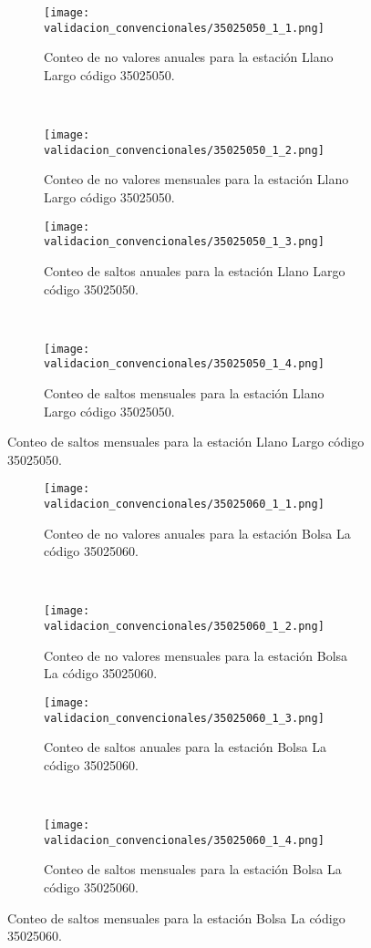 \begin{figure}[H]\ContinuedFloat
\centering
	\begin{subfigure}[normla]{0.4\textwidth}
	\texttt{[image: validacion\_convencionales/35025050\_1\_1.png]}
		\caption{Conteo de no valores anuales para la estación Llano Largo código 35025050.}
		\label{subfig:a1}
		\end{subfigure}
		~
    \begin{subfigure}[normla]{0.4\textwidth}
	\texttt{[image: validacion\_convencionales/35025050\_1\_2.png]}
		\caption{Conteo de no valores mensuales para la estación Llano Largo código 35025050.}
		\label{subfig:a2}
		\end{subfigure}
		
    \begin{subfigure}[normla]{0.4\textwidth}
	\texttt{[image: validacion\_convencionales/35025050\_1\_3.png]}
		\caption{Conteo de saltos anuales para la estación Llano Largo código 35025050.}
		\label{subfig:a1}
		\end{subfigure}
		~
    \begin{subfigure}[normla]{0.4\textwidth}
	\texttt{[image: validacion\_convencionales/35025050\_1\_4.png]}
		\caption{Conteo de saltos mensuales para la estación Llano Largo código 35025050.}
		\label{subfig:a2}
		\end{subfigure}

	
\end{figure}
           
\begin{figure}[H]\ContinuedFloat
\centering
	\begin{subfigure}[normla]{0.4\textwidth}
	\texttt{[image: validacion\_convencionales/35025060\_1\_1.png]}
		\caption{Conteo de no valores anuales para la estación Bolsa La código 35025060.}
		\label{subfig:a1}
		\end{subfigure}
		~
    \begin{subfigure}[normla]{0.4\textwidth}
	\texttt{[image: validacion\_convencionales/35025060\_1\_2.png]}
		\caption{Conteo de no valores mensuales para la estación Bolsa La código 35025060.}
		\label{subfig:a2}
		\end{subfigure}
		
    \begin{subfigure}[normla]{0.4\textwidth}
	\texttt{[image: validacion\_convencionales/35025060\_1\_3.png]}
		\caption{Conteo de saltos anuales para la estación Bolsa La código 35025060.}
		\label{subfig:a1}
		\end{subfigure}
		~
    \begin{subfigure}[normla]{0.4\textwidth}
	\texttt{[image: validacion\_convencionales/35025060\_1\_4.png]}
		\caption{Conteo de saltos mensuales para la estación Bolsa La código 35025060.}
		\label{subfig:a2}
		\end{subfigure}

	
\end{figure}
           
